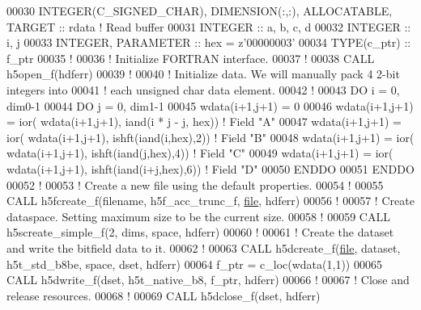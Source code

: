 \begin{DoxyCode}
00030   \textcolor{keywordtype}{INTEGER(C\_SIGNED\_CHAR)}, \textcolor{keywordtype}{DIMENSION(:,:)}, \textcolor{keywordtype}{ALLOCATABLE}, \textcolor{keywordtype}{TARGET} :: rdata    \textcolor{comment}{! Read buffer}
00031   \textcolor{keywordtype}{INTEGER} :: a, b, c, d
00032   \textcolor{keywordtype}{INTEGER} :: i, j
00033   \textcolor{keywordtype}{INTEGER}, \textcolor{keywordtype}{PARAMETER} :: hex =  z\textcolor{stringliteral}{'00000003'}
00034   \textcolor{keywordtype}{TYPE}(c\_ptr) :: f\_ptr
00035   \textcolor{comment}{!}
00036   \textcolor{comment}{! Initialize FORTRAN interface.}
00037   \textcolor{comment}{!}
00038   \textcolor{keyword}{CALL }h5open\_f(hdferr)
00039   \textcolor{comment}{!}
00040   \textcolor{comment}{! Initialize data.  We will manually pack 4 2-bit integers into}
00041   \textcolor{comment}{! each unsigned char data element.}
00042   \textcolor{comment}{!}
00043   \textcolor{keywordflow}{DO} i = 0, dim0-1
00044      \textcolor{keywordflow}{DO} j = 0, dim1-1
00045         wdata(i+1,j+1) = 0
00046         wdata(i+1,j+1) = ior( wdata(i+1,j+1), iand(i * j - j, hex))   \textcolor{comment}{! Field "A"}
00047         wdata(i+1,j+1) = ior( wdata(i+1,j+1), ishft(iand(i,hex),2))   \textcolor{comment}{! Field "B"}
00048         wdata(i+1,j+1) = ior( wdata(i+1,j+1), ishft(iand(j,hex),4))   \textcolor{comment}{! Field "C"}
00049         wdata(i+1,j+1) = ior( wdata(i+1,j+1), ishft(iand(i+j,hex),6)) \textcolor{comment}{! Field "D"}
00050 \textcolor{keywordflow}{     ENDDO}
00051 \textcolor{keywordflow}{  ENDDO}
00052   \textcolor{comment}{!}
00053   \textcolor{comment}{! Create a new file using the default properties.}
00054   \textcolor{comment}{!}
00055   \textcolor{keyword}{CALL }h5fcreate\_f(filename, h5f\_acc\_trunc\_f, \hyperlink{structfile}{file}, hdferr)
00056   \textcolor{comment}{!}
00057   \textcolor{comment}{! Create dataspace.  Setting maximum size to be the current size.}
00058   \textcolor{comment}{!}
00059   \textcolor{keyword}{CALL }h5screate\_simple\_f(2, dims, space, hdferr)
00060   \textcolor{comment}{!}
00061   \textcolor{comment}{! Create the dataset and write the bitfield data to it.}
00062   \textcolor{comment}{!}
00063   \textcolor{keyword}{CALL }h5dcreate\_f(\hyperlink{structfile}{file}, dataset, h5t\_std\_b8be, space, dset, hdferr)
00064   f\_ptr = c\_loc(wdata(1,1))
00065   \textcolor{keyword}{CALL }h5dwrite\_f(dset, h5t\_native\_b8, f\_ptr, hdferr)
00066   \textcolor{comment}{!}
00067   \textcolor{comment}{! Close and release resources.}
00068   \textcolor{comment}{!}
00069   \textcolor{keyword}{CALL }h5dclose\_f(dset, hdferr)

\end{DoxyCode}
